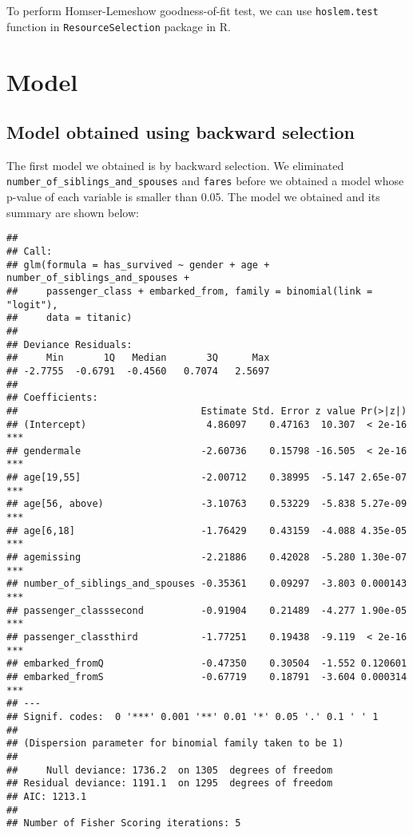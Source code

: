 \documentclass[12pt, oneside]{book}
\theoremstyle{definition}
\theoremstyle{definition}
\theoremstyle{definition}
\theoremstyle{remark}
\begin{document}
To perform Homser-Lemeshow goodness-of-fit test, we can use
\texttt{hoslem.test} function in \texttt{ResourceSelection} package in
R.

\hypertarget{model}{%
\chapter{Model}\label{model}}

\hypertarget{model-obtained-using-backward-selection}{%
\section{Model obtained using backward
selection}\label{model-obtained-using-backward-selection}}

The first model we obtained is by backward selection. We eliminated
\texttt{number\_of\_siblings\_and\_spouses} and \texttt{fares} before we
obtained a model whose p-value of each variable is smaller than 0.05.
The model we obtained and its summary are shown below:

\begin{verbatim}
## 
## Call:
## glm(formula = has_survived ~ gender + age + number_of_siblings_and_spouses + 
##     passenger_class + embarked_from, family = binomial(link = "logit"), 
##     data = titanic)
## 
## Deviance Residuals: 
##     Min       1Q   Median       3Q      Max  
## -2.7755  -0.6791  -0.4560   0.7074   2.5697  
## 
## Coefficients:
##                                Estimate Std. Error z value Pr(>|z|)    
## (Intercept)                     4.86097    0.47163  10.307  < 2e-16 ***
## gendermale                     -2.60736    0.15798 -16.505  < 2e-16 ***
## age[19,55]                     -2.00712    0.38995  -5.147 2.65e-07 ***
## age[56, above)                 -3.10763    0.53229  -5.838 5.27e-09 ***
## age[6,18]                      -1.76429    0.43159  -4.088 4.35e-05 ***
## agemissing                     -2.21886    0.42028  -5.280 1.30e-07 ***
## number_of_siblings_and_spouses -0.35361    0.09297  -3.803 0.000143 ***
## passenger_classsecond          -0.91904    0.21489  -4.277 1.90e-05 ***
## passenger_classthird           -1.77251    0.19438  -9.119  < 2e-16 ***
## embarked_fromQ                 -0.47350    0.30504  -1.552 0.120601    
## embarked_fromS                 -0.67719    0.18791  -3.604 0.000314 ***
## ---
## Signif. codes:  0 '***' 0.001 '**' 0.01 '*' 0.05 '.' 0.1 ' ' 1
## 
## (Dispersion parameter for binomial family taken to be 1)
## 
##     Null deviance: 1736.2  on 1305  degrees of freedom
## Residual deviance: 1191.1  on 1295  degrees of freedom
## AIC: 1213.1
## 
## Number of Fisher Scoring iterations: 5
\end{verbatim}
\end{document}
